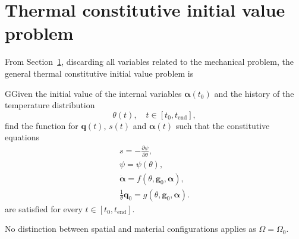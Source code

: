 \section{Thermal constitutive initial value problem}

From Section~\ref{}, discarding all variables related to the mechanical problem, the general thermal constitutive initial value problem is
\begin{problem}
GGiven the initial value of the internal variables \(\bm \alpha(t_0)\) and the history of the temperature distribution
\[\theta(t),\quad t\in[t_0, t_\text{end}],\]
find the function for $\bm q(t)$, \(s(t)\) and \(\bm \alpha(t)\) such that the constitutive equations
\begin{gather}
    s = -\frac{\partial \psi}{\partial \theta},\label{eq:entropy_constitutive_relation}\\
    \psi = \psi(\theta),\\
    \dot{\bm \alpha} = f(\theta, \bm g_0, \bm \alpha),\\
    \frac{1}{\theta}\bm q_0 = g(\theta, \bm g_0, \bm \alpha).
\end{gather}
are satisfied for every $t\in [t_0, t_\text{end}]$.
\end{problem}
No distinction between spatial and material configurations applies as \(\Omega = \Omega_0\).

